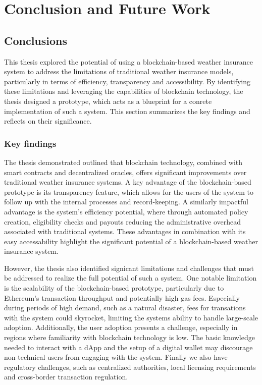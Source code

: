 \chapter{Conclusion and Future Work}\label{chapter:summary_conclusion}
\section{Conclusions}\label{section:conclusions}
This thesis explored the potential of using a blockchain-based weather insurance system to address the limitations of traditional weather insurance models, particularly in terms of efficiency, transparency and accessibility. By identifying these limitations and leveraging the capabilities of blockchain technology, the thesis designed a prototype, which acts as a blueprint for a conrete implementation of such a system. This section summarizes the key findings and reflects on their significance.

\subsection{Key findings}
The thesis demonstrated outlined that blockchain technology, combined with smart contracts and decentralized oracles, offers significant improvements over traditional weather insurance systems. A key advantage of the blockchain-based prototype is its transparency feature, which allows for the users of the system to follow up with the internal processes and record-keeping. A similarly impactful advantage is the system's efficiency potential, where through automated policy creation, eligibility checks and payouts reducing the administrative overhead associated with traditional systems. These advantages in combination with its easy accessability highlight the significant potential of a blockchain-based weather insurance system. 

However, the thesis also identified signicant limitations and challenges that must be addressed to realize the full potential of such a system. One notable limitation is the scalability of the blockchain-based prototype, particularly due to Ethereum's transaction throughput and potentially high gas fees. Especially during periods of high demand, such as a natural disaster, fees for transations with the system could skyrocket, limiting the systems ability to handle large-scale adoption. Additionally, the user adoption presents a challenge, especially in regions where familiarity with blockchain technology is low. The basic knowledge needed to interact with a dApp and the setup of a digital wallet may discourage non-technical users from engaging with the system. Finally we also have regulatory challenges, such as centralized authorities, local licensing requirements and cross-border transaction regulation.

